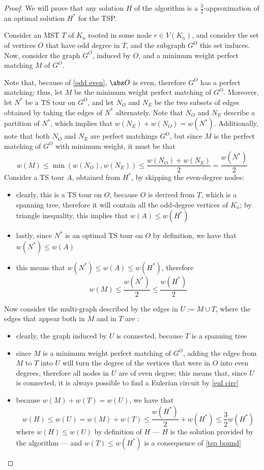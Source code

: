 \documentclass[a4paper, 12pt]{report}
\begin{document}
    \begin{proof}
        We will prove that any solution $H$ of the algorithm is a $\frac{3}{2}$-approximation of an optimal solution $H^*$ for the TSP.

        Consider an MST $T$ of $K_n$ rooted in some node $r \in V(K_n)$, and consider the set of vertices $O$ that have odd degree in $T$, and the subgraph $G^O$ this set induces. Now, consider the graph $G^O$, induced by $O$, and a minimum weight perfect matching $M$ of $G^O$.

        Note that, because of \cref{odd even}, $\abs O$ is even, therefore $G^O$ has a perfect matching; thus, let $M$ be the minimum weight perfect matching of $G^O$. Moreover, let $N^*$ be a TS tour on $G^O$, and let $N_O$ and $N_E$ be the two subsets of edges obtained by taking the edges of $N^*$ alternately. Note that $N_O$ and $N_E$ describe a partition of $N^*$, which implies that $w(N_E) + w(N_O) = w(N^*)$. Additionally, note that both $N_O$ and $N_E$ are perfect matchings $G^O$, but since $M$ is the perfect matching of $G^O$ with minimum weight, it must be that $$w(M) \le \min (w(N_O), w(N_E)) \le \dfrac{w(N_O) + w(N_E)}{2} = \dfrac{w(N^*)}{2}$$ Consider a TS tour $A$, obtained from $H^*$, by skipping the even-degree nodes:

        \begin{itemize}
            \item clearly, this is a TS tour on $O$, because $O$ is derived from $T$, which is a spanning tree, therefore it will contain all the odd-degree vertices of $K_n$; by triangle inequality, this implies that $w(A) \le w(H^*)$
            \item lastly, since $N^*$ is an optimal TS tour on $O$ by definition, we have that $w(N^*) \le w(A)$
            \item this means that $w(N^*) \le w(A) \le w(H^*)$, therefore $$w(M) \le \dfrac{w(N^*)}{2} \le \dfrac{w(H^*)}{2}$$
        \end{itemize}

        Now consider the multi-graph described by the edges in $U := M \cup T$, where the edges that appear both in $M$ and in $T$ are :
        
        \begin{itemize}
            \item clearly, the graph induced by $U$ is connected, because $T$ is a spanning tree
            \item since $M$ is a minimum weight perfect matching of $G^O$, adding the edges from $M$ to $T$ into $U$ will turn the degree of the vertices that were in $O$ into even degrees, therefore all nodes in $U$ are of even degree; this means that, since $U$ is connected, it is always possible to find a Eulerian circuit by \cref{eul circ}
            \item because $w(M) + w(T) = w(U)$, we have that $$w(H) \le w(U) = w(M) + w(T) \le \dfrac{w(H^*)}{2} + w(H^*) \le \dfrac{3}{2}w(H^*)$$ where $w(H) \le w(U)$ by definition of $H$ --- $H$ is the solution provided by the algorithm --- and $w(T) \le w(H^*)$ is a consequence of \cref{tsp bound}
        \end{itemize}
    \end{proof}
\end{document}
